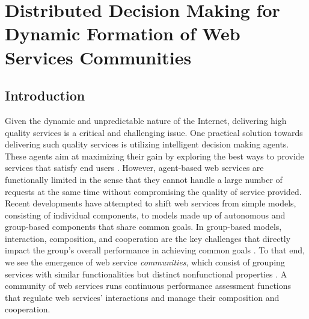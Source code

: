 \setcounter{chapter}{3}

\chapter{Distributed Decision Making for Dynamic Formation of Web Services Communities}\label{cha:PCTLKC}


\section{Introduction}

Given the dynamic and unpredictable nature of the Internet, delivering high quality services is a critical and challenging issue. One practical solution towards delivering such quality services is utilizing intelligent decision making agents. These agents aim at maximizing their gain by exploring the best ways to provide services that satisfy end users \cite{Zeng:2003:QDW:775152.775211, 10.1109/ARES.2008.7, Demirkan2013412, journals/tsc/ZhengZYB13, Josang:2007:STR:1225318.1225716}. However, agent-based web services are functionally limited in the sense that they cannot handle a large number of requests at the same time without compromising the quality of service provided. Recent developments have attempted to shift web services from simple models, consisting of individual components, to models made up of autonomous and group-based components that share common goals. In group-based models, interaction, composition, and cooperation are the key challenges that directly impact the group's overall performance in achieving common goals \cite{ICWS2011-1, SCC2011-1, journals/mags/BaldoniBM10, journals/jcss/CasadoYT13}. To that end, we see the emergence of web service \emph{communities}, which consist of grouping services with similar functionalities but distinct nonfunctional properties \cite{Zeng:2003:QDW:775152.775211, 10.1109/ARES.2008.7, Paik:2005:TSS:2229263.2230038, Medjahed05adynamic}. A community of web services runs continuous performance assessment functions that regulate web services' interactions and manage their composition and cooperation.


